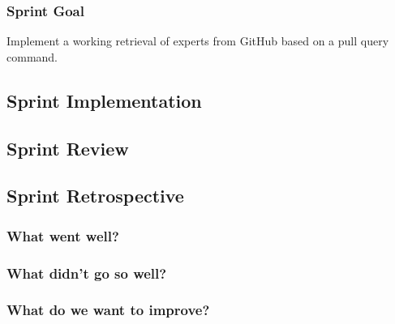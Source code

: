 \subsubsection{Sprint Goal}

Implement a working retrieval of experts from GitHub based on a pull query command.

\subsection{Sprint Implementation}

\subsection{Sprint Review}

\subsection{Sprint Retrospective}

\subsubsection{What went well?}

\subsubsection{What didn't go so well?}

\subsubsection{What do we want to improve?}